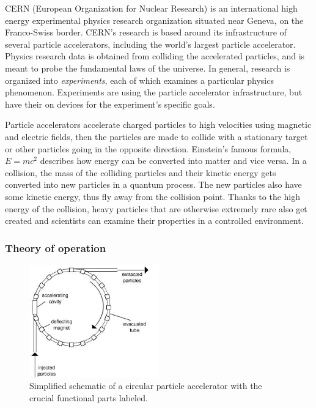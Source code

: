 \documentclass[12pt]{article}
\begin{document}
CERN (European Organization for Nuclear Research) is an international high energy experimental physics research organization situated near Geneva, on the Franco-Swiss border. CERN's research is based around its infrastructure of several particle accelerators, including the world's largest particle accelerator. Physics research data is obtained from colliding the accelerated particles, and is meant to probe the fundamental laws of the universe. In general, research is organized into \textit{experiments}, each of which examines a particular physics phenomenon. Experiments are using the particle accelerator infrastructure, but have their on devices for the experiment's specific goals.
\cite{cern_about}

\vspace{1pc}\noindent
Particle accelerators accelerate charged particles to high velocities using magnetic and electric fields, then the particles are made to collide with a stationary target or other particles going in the opposite direction. Einstein's famous formula, $E=mc^2$ describes how energy can be converted into matter and vice versa. In a collision, the mass of the colliding particles and their kinetic energy gets converted into new particles in a quantum process. The new particles also have some kinetic energy, thus fly away from the collision point. Thanks to the high energy of the collision, heavy particles that are otherwise extremely rare also get created and scientists can examine their properties in a controlled environment.

\subsubsection{Theory of operation}\label{sec_part_accel_theory}

\begin{figure}[H]
	\begin{center}
		\includegraphics[width=0.5\textwidth]{particle_accelerator_schematic}
	\end{center}
	\caption{Simplified schematic of a circular particle accelerator with the crucial functional parts labeled.}
	\label{fig_part_accel_schematic}
\end{figure}
\end{document}
